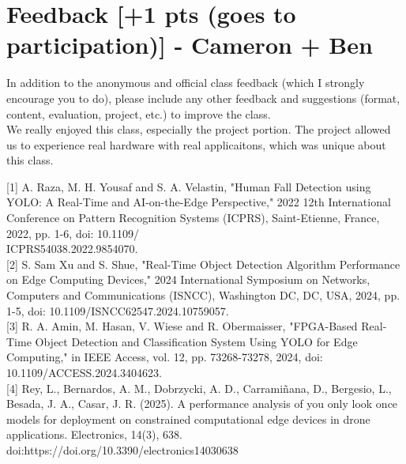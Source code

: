 \documentclass[sigconf,authorversion,nonacm]{acmart}
\begin{document}
\section{Feedback {\small {[+1 pts (goes to participation)]}} - Cameron + Ben}  
In addition to the anonymous and official class feedback (which I strongly encourage you to do), please include any other feedback and suggestions (format, content, evaluation, project, etc.) to improve the class. \\

We really enjoyed this class, especially the project portion. The project allowed us to experience real hardware with real applicaitons, which was unique about this class.






[1] A. Raza, M. H. Yousaf and S. A. Velastin, "Human Fall Detection using YOLO: A Real-Time and AI-on-the-Edge Perspective," 2022 12th International Conference on Pattern Recognition Systems (ICPRS), Saint-Etienne, France, 2022, pp. 1-6, doi: 10.1109/\\ICPRS54038.2022.9854070.\\

[2] S. Sam Xu and S. Shue, "Real-Time Object Detection Algorithm Performance on Edge Computing Devices," 2024 International Symposium on Networks, Computers and Communications (ISNCC), Washington DC, DC, USA, 2024, pp. 1-5, doi: 10.1109/ISNCC62547.2024.10759057. \\

[3] R. A. Amin, M. Hasan, V. Wiese and R. Obermaisser, "FPGA-Based Real-Time Object Detection and Classification System Using YOLO for Edge Computing," in IEEE Access, vol. 12, pp. 73268-73278, 2024, doi: 10.1109/ACCESS.2024.3404623. \\

[4] Rey, L., Bernardos, A. M., Dobrzycki, A. D., Carramiñana, D., Bergesio, L., Besada, J. A., Casar, J. R. (2025). A performance analysis of you only look once models for deployment on constrained computational edge devices in drone applications. Electronics, 14(3), 638. doi:https://doi.org/10.3390/electronics14030638
\end{document}
